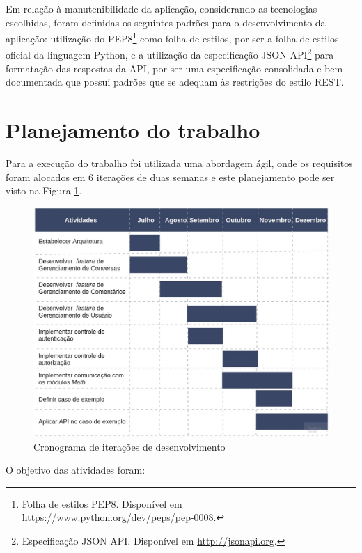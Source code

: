     Em relação à manutenibilidade da aplicação, considerando as tecnologias escolhidas,
    foram definidas os seguintes padrões para o desenvolvimento da aplicação:
    utilização do PEP8\footnote{Folha de estilos PEP8. Disponível em \href{https://www.python.org/dev/peps/pep-0008/}{https://www.python.org/dev/peps/pep-0008}.}
    como folha de estilos, por ser a folha de estilos oficial da linguagem Python,
    e a utilização da especificação JSON API\footnote{Especificação JSON API. Disponível em \href{http://jsonapi.org/}{http://jsonapi.org}.}
    para formatação das respostas da API, por ser uma especificação consolidada e bem documentada que possui padrões que
    se adequam às restrições do estilo REST.
    
\section{Planejamento do trabalho}

    Para a execução do trabalho foi utilizada uma abordagem ágil, 
    onde os requisitos foram alocados em 6 iterações de duas semanas 
    e este planejamento pode ser visto na Figura \ref{fig:cronograma}.
    
    \begin{figure}[h!]
      \centering
      \includegraphics[scale=0.3]{figuras/cronograma.jpg}
      \caption{Cronograma de iterações de desenvolvimento}
      \label{fig:cronograma}
    \end{figure}
    
    O objetivo das atividades foram: 

